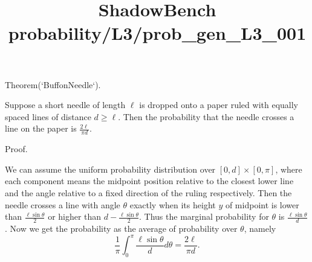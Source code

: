\documentclass{article}
\title{ShadowBench probability/L3/prob\_gen\_L3\_001}
\begin{document}
\maketitle

Theorem(`BuffonNeedle`).

Suppose a short needle of length $\ell$ is dropped onto a paper ruled with equally spaced lines of distance $d \ge \ell$. Then the probability that the needle crosses a line on the paper is $\frac{2\ell}{\pi d}$.

Proof.

We can assume the uniform probability distribution over $[0, d] \times [0, \pi]$, where each component means the midpoint position relative to the closest lower line and the angle relative to a fixed direction of the ruling respectively. Then the needle crosses a line with angle $\theta$ exactly when its height $y$ of midpoint is lower than $\frac{\ell \sin \theta}{2}$ or higher than $d - \frac{\ell \sin \theta}{2}$. Thus the marginal probability for $\theta$ is $\frac{\ell \sin \theta}{d}$. Now we get the probability as the average of probability over $\theta$, namely
$$
\frac{1}{\pi} \int_0^\pi \frac{\ell \sin \theta}{d} d\theta = \frac{2\ell}{\pi d}.
$$
\end{document}

